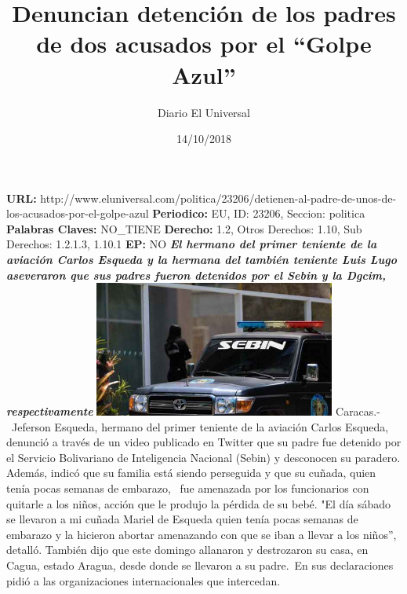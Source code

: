 \documentclass{article}%
\title{\textbf{Denuncian detención de los padres de dos acusados por el “Golpe Azul”}}%
\author{Diario El Universal}%
\date{14/10/2018}%
\begin{document}
%
\normalsize%
\maketitle%
\textbf{URL: }%
http://www.eluniversal.com/politica/23206/detienen{-}al{-}padre{-}de{-}unos{-}de{-}los{-}acusados{-}por{-}el{-}golpe{-}azul\newline%
%
\textbf{Periodico: }%
EU, %
ID: %
23206, %
Seccion: %
politica\newline%
%
\textbf{Palabras Claves: }%
NO\_TIENE\newline%
%
\textbf{Derecho: }%
1.2, %
Otros Derechos: %
1.10, %
Sub Derechos: %
1.2.1.3, 1.10.1\newline%
%
\textbf{EP: }%
NO\newline%
\newline%
%
\textbf{\textit{El hermano del primer teniente de la aviación Carlos Esqueda y la hermana del también teniente Luis Lugo aseveraron que sus padres fueron detenidos por el Sebin y la Dgcim, respectivamente}}%
\newline%
\newline%
%
\includegraphics[width=300px]{229.jpg}%
\newline%
%
Caracas.{-}~Jeferson Esqueda, hermano del primer teniente de la aviación Carlos Esqueda, denunció a través de un video publicado en Twitter que su padre fue detenido por el Servicio Bolivariano de Inteligencia Nacional (Sebin) y desconocen su paradero.%
\newline%
%
Además, indicó que su familia está siendo perseguida y que su cuñada, quien tenía pocas semanas de embarazo,~ fue amenazada por los funcionarios con quitarle a los niños, acción que le produjo la pérdida de su bebé.%
\newline%
%
"El día sábado se llevaron a mi cuñada Mariel de Esqueda quien tenía pocas semanas de embarazo y la hicieron abortar amenazando con que se iban a llevar a los niños”, detalló.%
\newline%
%
También dijo que este domingo allanaron y destrozaron su casa, en Cagua, estado Aragua, desde donde se llevaron a su padre.~En sus declaraciones pidió a las organizaciones internacionales que intercedan.%
\end{document}
